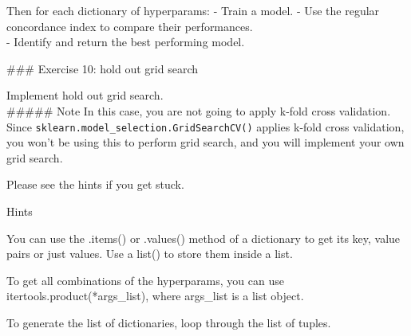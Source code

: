 \documentclass[11pt]{article}
\begin{document}
Then for each dictionary of hyperparams: - Train a model. - Use the
regular concordance index to compare their performances.\\
- Identify and return the best performing model.

     \#\#\# Exercise 10: hold out grid search

Implement hold out grid search.\\
\#\#\#\#\# Note In this case, you are not going to apply k-fold cross
validation. Since \texttt{sklearn.model\_selection.GridSearchCV()}
applies k-fold cross validation, you won't be using this to perform grid
search, and you will implement your own grid search.

Please see the hints if you get stuck.

     Hints

You can use the .items() or .values() method of a dictionary to get its
key, value pairs or just values. Use a list() to store them inside a
list.

To get all combinations of the hyperparams, you can use
itertools.product(*args\_list), where args\_list is a list object.

To generate the list of dictionaries, loop through the list of tuples.
\end{document}
